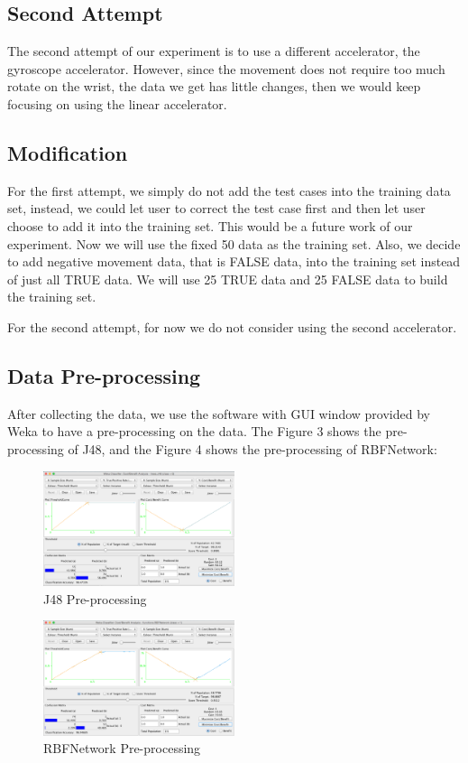\documentclass[12pt,twocolumn]{article}
\begin{document}
\subsection{Second Attempt}
The second attempt of our experiment is to use a different accelerator, the gyroscope accelerator. However, since the movement does not require too much rotate on  the wrist, the data we get has little changes, then we would keep focusing on using the linear accelerator.

\subsection{Modification}
For the first attempt, we simply do not add the test cases into the training data set, instead, we could let user to correct the test case first and then let user choose to add it into the training set. This would be a future work of our experiment. Now we will use the fixed 50 data as the training set. Also, we decide to add negative movement data, that is FALSE data, into the training set instead of just all TRUE data. We will use 25 TRUE data and 25 FALSE data to build the training set.

For the second attempt, for now we do not consider using the second accelerator.

\subsection{Data Pre-processing}
After collecting the data, we use the software with GUI window provided by Weka to have a pre-processing on the data. The Figure 3 shows the pre-processing of J48, and the Figure 4 shows the pre-processing of RBFNetwork:

\begin{figure}[htbp]
\centering
\includegraphics[width=0.5\textwidth]{pre_j48}
\caption{J48 Pre-processing}
\label{fig:pre_j48}
\end{figure}

\begin{figure}[htbp]
\centering
\includegraphics[width=0.5\textwidth]{pre_rbfnetwork}
\caption{RBFNetwork Pre-processing}
\label{fig:pre_rbfnetwork}
\end{figure}
\end{document}
